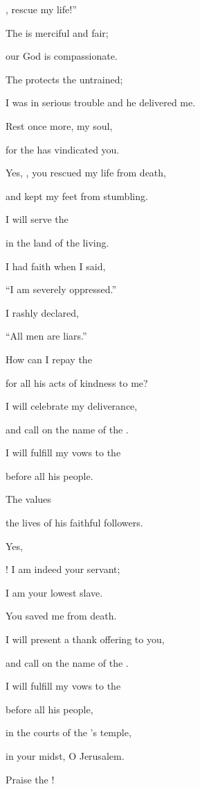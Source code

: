 {{}, rescue
my life!”
\par }{\Q {}The
{}
is merciful
and fair;
\par }{\Q our God
is compassionate.
\par }{\Q {}The
{}
protects
the untrained;
\par }{\Q I was in serious
trouble and he delivered me.
\par }{\Q {}Rest
once
more, my soul,
\par }{\Q for
the {}
has vindicated you.
\par }{\Q {}Yes,
{}, you rescued
my life
from death,
\par }{\Q and kept my
feet
from
stumbling.
\par }{\Q {}I will serve
the {}
\par }{\Q in the land
of the living.
\par }{\Q {}I had faith
when
I said,
\par }{\Q “I
am severely
oppressed.”
\par }{\Q {}I
rashly
declared,
\par }{\Q “All
men
are liars.”
\par }{\Q {}How
can I repay
the {}
\par }{\Q for all
his acts of kindness
to me?
\par }{\Q {}I will celebrate
my deliverance,
\par }{\Q and call
on the name
of the {}.
\par }{\Q {}I will fulfill
my vows
to the
{}
\par }{\Q before
all
his people.
\par }{\Q {}The
{}
values
\par }{\Q the lives of his faithful followers.
\par }{\Q {}Yes,

{}! I am
indeed
your servant;
\par }{\Q I am
your lowest
slave.
\par }{\Q You saved me from death.
\par }{\Q {}I will present a thank
offering to you,
\par }{\Q and call
on the name
of the {}.
\par }{\Q {}I will fulfill
my vows
to the
{}
\par }{\Q before
all
his people,
\par }{\Q {}in the courts
of the
{}’s
temple,
\par }{\Q in your midst,
O Jerusalem.
\par }{\Q Praise
the
{}!


}

